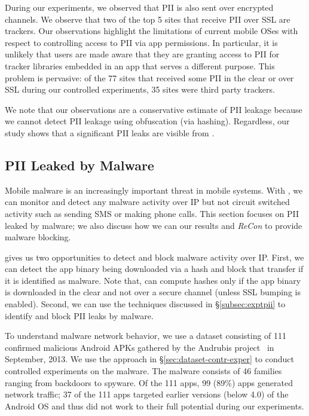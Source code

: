 During our experiments, we observed that PII is also sent over encrypted channels.  
We observe that two of the top 5 sites that receive PII over SSL are trackers.
Our observations highlight the limitations of current mobile OSes with respect to controlling access to PII via app permissions. 
In particular, it is unlikely that users are made aware that they are granting access to PII for tracker libraries embedded in an app that serves a different purpose. 
This problem is pervasive: of the 77 sites that received some PII in the clear or over SSL during our controlled experiments, 35 sites were third party trackers.

We note that our observations are a conservative estimate of PII leakage 
because we cannot detect PII leakage using obfuscation (\eg via hashing). 
Regardless, our study shows that a significant PII leaks are  
visible from \meddle. 

\subsection{PII Leaked by Malware}
\label{subsec:malware}

Mobile malware is an increasingly important threat in mobile systems. With  
\meddle, we can monitor and detect any malware activity over IP but not circuit switched activity such as 
sending SMS or making phone calls. This section focuses on PII leaked by malware; 
we also discuss how we can our results and \emph{ReCon} to provide malware blocking.

\meddle gives us two opportunities to detect and block malware activity over IP. 
First, we can detect the app binary being downloaded via a hash and block that transfer if it is identified as malware. 
Note that, \meddle can compute hashes only if the app binary is downloaded in the clear and not over a secure channel (unless SSL bumping is enabled).
Second, we can use the techniques discussed in \S\ref{subsec:exptpii} to identify and block PII leaks by malware. 

To understand malware network behavior, we use a dataset consisting of 111 confirmed malicious Android APKs 
gathered by the Andrubis project~\cite{andrubis} in September, 2013.  
We use the approach in \S\ref{sec:dataset-contr-exper} to conduct controlled experiments on the malware.
The malware consists of 46 families ranging from backdoors to spyware. 
Of the 111 apps, 99 (89\%) apps generated network traffic; 37 of the 111 apps targeted earlier versions (below 4.0) of the Android OS and thus did not work to their full potential during our experiments.%

